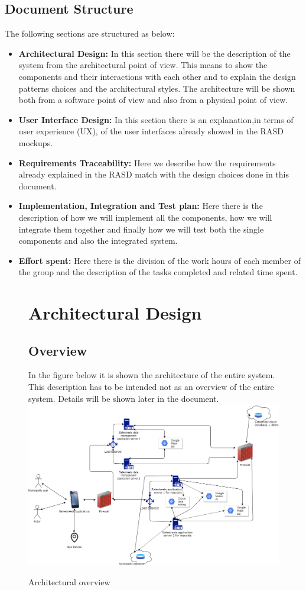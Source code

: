 \documentclass[titlepage]{article}
\begin{document}
\subsection{Document Structure}
The following sections are structured as below:
\begin{itemize}
	\item \textbf{Architectural Design: }In this section there will be the description of the system from the architectural point of view. This means to show the components and their interactions with each other and to explain the design patterns choices and the architectural styles. The architecture will be shown both from a software point of view and also from a physical point of view.
	\item \textbf{User Interface Design:} In this section there is an explanation,in terms of user experience (UX), of the user interfaces already showed in the RASD mockups.
	\item \textbf{Requirements Traceability:} Here we describe how the requirements already explained in the RASD match with the design choices done in this document.
	\item \textbf{Implementation, Integration and Test plan:} Here there is the description of how we will implement all the components, how we will integrate them together and finally how we will test both the single components and also the integrated system.
	\item \textbf{Effort spent:} Here there is the division of the work hours of each member of the group and the description of the tasks completed and related time spent.
\end{itemize}
\begin{figure}[h]
\section{Architectural Design}
	\subsection{Overview}
In the figure below it is shown the architecture of the entire system. This description has to be intended not as an overview of the entire system. Details will be shown later in the document.
	\includegraphics[scale=0.419]{Diagrams/overview.png}
	\caption{Architectural overview}
\end{figure}
\end{document}
